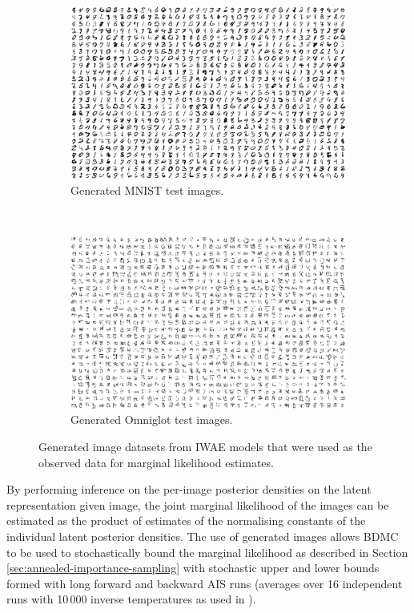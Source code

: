\begin{figure}
\begin{subfigure}[b]{0.95\linewidth}
\centering
\includegraphics[width=\textwidth]{images/continuous-tempering/mnist-samples.pdf}
\caption{Generated MNIST test images.}
\label{sfig:mnist-samples}
\end{subfigure}
\\[5mm]
\begin{subfigure}[b]{0.95\linewidth}
\centering
\includegraphics[width=\textwidth]{images/continuous-tempering/omniglot-samples.pdf}
\caption{Generated Omniglot test images.}
\label{sfig:omni-samples}
\end{subfigure}
\caption[\acs{IWAE} generated image datasets.]{Generated image datasets from \ac{IWAE} models that were used as the observed data for marginal likelihood estimates.}
\label{fig:iwae-generated-test-images}
\end{figure}

By performing inference on the per-image posterior densities on the latent representation given image, the joint marginal likelihood of the images can be estimated as the product of estimates of the normalising constants of the individual latent posterior densities. The use of generated images allows \ac{BDMC} \citep{grosse2015sandwiching} to be used to stochastically bound the marginal likelihood as described in Section \ref{sec:annealed-importance-sampling} with stochastic upper and lower bounds formed with long forward and backward \ac{AIS} runs (averages over 16 independent runs with 10\,000 inverse temperatures as used in \citep{wu2016quantitative}). 

